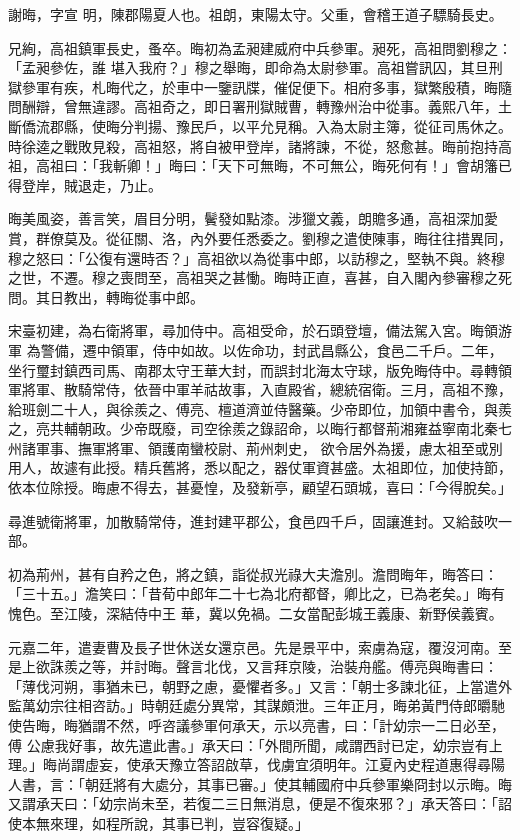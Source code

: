 
\begin{pinyinscope}

 謝晦，字宣
 明，陳郡陽夏人也。祖朗，東陽太守。父重，會稽王道子驃騎長史。



 兄絢，高祖鎮軍長史，蚤卒。晦初為孟昶建威府中兵參軍。昶死，高祖問劉穆之：「孟昶參佐，誰
 堪入我府？」穆之舉晦，即命為太尉參軍。高祖嘗訊囚，其旦刑獄參軍有疾，札晦代之，於車中一鑒訊牒，催促便下。相府多事，獄繁殷積，晦隨問酬辯，曾無違謬。高祖奇之，即日署刑獄賊曹，轉豫州治中從事。義熙八年，土斷僑流郡縣，使晦分判揚、豫民戶，以平允見稱。入為太尉主簿，從征司馬休之。時徐逵之戰敗見殺，高祖怒，將自被甲登岸，諸將諫，不從，怒愈甚。晦前抱持高祖，高祖曰：「我斬卿！」晦曰：「天下可無晦，不可無公，晦死何有！」會胡籓已
 得登岸，賊退走，乃止。



 晦美風姿，善言笑，眉目分明，鬢發如點漆。涉獵文義，朗贍多通，高祖深加愛賞，群僚莫及。從征關、洛，內外要任悉委之。劉穆之遣使陳事，晦往往措異同，穆之怒曰：「公復有還時否？」高祖欲以為從事中郎，以訪穆之，堅執不與。終穆之世，不遷。穆之喪問至，高祖哭之甚慟。晦時正直，喜甚，自入閣內參審穆之死問。其日教出，轉晦從事中郎。



 宋臺初建，為右衛將軍，尋加侍中。高祖受命，於石頭登壇，備法駕入宮。晦領游軍
 為警備，遷中領軍，侍中如故。以佐命功，封武昌縣公，食邑二千戶。二年，坐行璽封鎮西司馬、南郡太守王華大封，而誤封北海太守球，版免晦侍中。尋轉領軍將軍、散騎常侍，依晉中軍羊祜故事，入直殿省，總統宿衛。三月，高祖不豫，給班劍二十人，與徐羨之、傅亮、檀道濟並侍醫藥。少帝即位，加領中書令，與羨之，亮共輔朝政。少帝既廢，司空徐羨之錄詔命，以晦行都督荊湘雍益寧南北秦七州諸軍事、撫軍將軍、領護南蠻校尉、荊州刺史，
 欲令居外為援，慮太祖至或別用人，故遽有此授。精兵舊將，悉以配之，器仗軍資甚盛。太祖即位，加使持節，依本位除授。晦慮不得去，甚憂惶，及發新亭，顧望石頭城，喜曰：「今得脫矣。」



 尋進號衛將軍，加散騎常侍，進封建平郡公，食邑四千戶，固讓進封。又給鼓吹一部。



 初為荊州，甚有自矜之色，將之鎮，詣從叔光祿大夫澹別。澹問晦年，晦答曰：「三十五。」澹笑曰：「昔荀中郎年二十七為北府都督，卿比之，已為老矣。」晦有愧色。至江陵，深結侍中王
 華，冀以免禍。二女當配彭城王義康、新野侯義賓。



 元嘉二年，遣妻曹及長子世休送女還京邑。先是景平中，索虜為寇，覆沒河南。至是上欲誅羨之等，并討晦。聲言北伐，又言拜京陵，治裝舟艦。傅亮與晦書曰：「薄伐河朔，事猶未已，朝野之慮，憂懼者多。」又言：「朝士多諫北征，上當遣外監萬幼宗往相咨訪。」時朝廷處分異常，其謀頗泄。三年正月，晦弟黃門侍郎㬭馳使告晦，晦猶謂不然，呼咨議參軍何承天，示以亮書，曰：「計幼宗一二日必至，傅
 公慮我好事，故先遣此書。」承天曰：「外間所聞，咸謂西討已定，幼宗豈有上理。」晦尚謂虛妄，使承天豫立答詔啟草，伐虜宜須明年。江夏內史程道惠得尋陽人書，言：「朝廷將有大處分，其事已審。」使其輔國府中兵參軍樂冏封以示晦。晦又謂承天曰：「幼宗尚未至，若復二三日無消息，便是不復來邪？」承天答曰：「詔使本無來理，如程所說，其事已判，豈容復疑。」




\end{pinyinscope}
